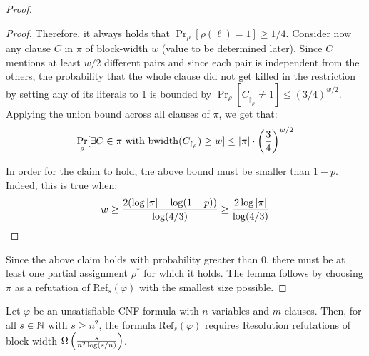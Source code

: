 \begin{proof}
\begin{proof}
        Therefore, it always holds that $\Pr_{\rho}[\rho(\ell) = 1] \geq 1/4$. Consider now any clause $C$ in $\pi$ of block-width $w$ (value to be determined later). Since $C$ mentions at least $w/2$ different pairs and since each pair is independent from the others, the probability that the whole clause did not get killed in the restriction by setting any of its literals to 1 is bounded by $\Pr_{\rho}[C_{\upharpoonright_{\rho}} \neq 1] \leq (3/4)^{w/2}$. Applying the union bound across all clauses of $\pi$, we get that:
        \begin{equation}
            \Pr_{\rho}[\exists C \in \pi \text{ with } \mathrm{bwidth}(C_{\upharpoonright_\rho}) \geq w] \leq \left|\pi\right| \cdot \left ( \frac{3}{4} \right )^{w/2}
        \end{equation}
            
        In order for the claim to hold, the above bound must be smaller than $1-p$. Indeed, this is true when:
        \begin{equation}
            w \geq \frac{2(\log \left|\pi\right| - \log (1-p))}{\log(4/3)} \geq \frac{2 \log \left|\pi\right|}{\log(4/3)}
        \end{equation}
    \end{proof}

    Since the above claim holds with probability greater than 0, there must be at least one partial assignment $\rho^*$ for which it holds. The lemma follows by choosing $\pi$ as a refutation of $\mathrm{Ref}_s(\varphi)$ with the smallest size possible.
\end{proof}


\begin{lemma}
    \label{lem:am_lower_bound}
    Let $\varphi$ be an unsatisfiable CNF formula with $n$ variables and $m$ clauses. Then, for all $s \in \mathbb{N}$ with $s \geq n^2$, the formula $\mathrm{Ref}_s(\varphi)$ requires Resolution refutations of block-width $\Omega \left ( \frac{s}{n^2\log(s/n)} \right )$.
\end{lemma}

